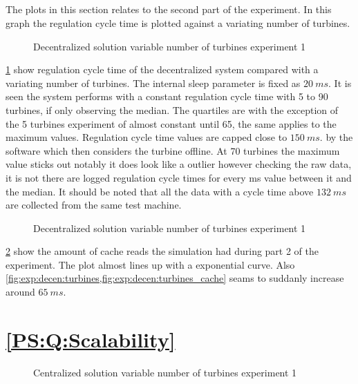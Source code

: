 \subsection{}
The plots in this section relates to the second part of the  experiment. In this graph the regulation cycle time is plotted against a variating number of turbines.

\begin{figure}[h]
	\centering
	
	\caption{Decentralized solution variable number of turbines experiment 1}
	\label{fig:exp:decen:turbines}
\end{figure}

\cref{fig:exp:decen:turbines} show regulation cycle time of the decentralized system compared with a variating number of turbines. The internal sleep parameter is fixed as $20~ms.$
It is seen the system performs with a constant regulation cycle time with 5 to 90 turbines, if only observing the median.
The quartiles are with the exception of the 5 turbines experiment of almost constant until 65, the same applies to the maximum values.
Regulation cycle time values are capped close to $150~ms.$ by the software which then considers the turbine offline.
At 70 turbines the maximum value sticks out notably it does look like a outlier however checking the raw data, it is not there are logged regulation cycle times for every ms value between it and the median.
It should be noted that all the data with a cycle time above $132~ms$ are collected from the same test machine.

\begin{figure}[h]
	\centering
	
	\caption{Decentralized solution variable number of turbines experiment 1}
	\label{fig:exp:decen:turbines_cache}
\end{figure}


\cref{fig:exp:decen:turbines_cache} show the amount of cache reads the simulation had during part 2 of the experiment.
The plot almost lines up with a exponential curve. Also \cref{fig:exp:decen:turbines,fig:exp:decen:turbines_cache} seams to suddanly increase around $65~ms.$

\section{\ref{PS:Q:Scalability}}

\begin{figure}[h]
	\centering
	
	\caption{Centralized solution variable number of turbines experiment 1}
	\label{fig:exp:cen:turbines}
\end{figure}
